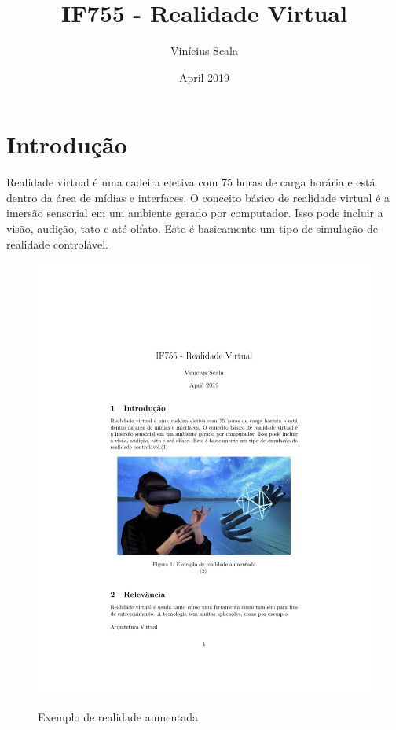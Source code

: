 \documentclass[10pt]{article}
\title{IF755 - Realidade Virtual}
\author{Vinícius Scala}
\date{April 2019}
\begin{document}
\maketitle

\section{Introdução}
Realidade virtual é uma cadeira eletiva com 75 horas de carga horária e está dentro da área de mídias e interfaces.
O conceito básico de realidade virtual é a imersão sensorial em um ambiente gerado por computador. Isso pode incluir a visão, audição, tato e até olfato. Este é basicamente um tipo de simulação de realidade controlável.\cite{intro}


\begin{figure}[h!]
\centering
\includegraphics[scale=0.3]{vsob}
\caption{Exemplo de realidade aumentada}\cite{imagem}
\label{fig:vsob}
\end{figure}
\end{document}
